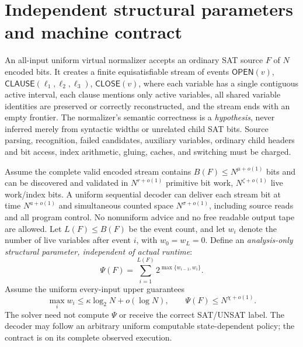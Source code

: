 \documentclass[11pt]{article}
\begin{document}
\section{Independent structural parameters and machine contract}
An all-input uniform virtual normalizer accepts an ordinary SAT source \(F\) of \(N\) encoded bits. It creates a finite equisatisfiable stream of events \(\mathsf{OPEN}(v)\), \(\mathsf{CLAUSE}(\ell_1,\ell_2,\ell_3)\), \(\mathsf{CLOSE}(v)\), where each variable has a single contiguous active interval, each clause mentions only active variables, all shared variable identities are preserved or correctly reconstructed, and the stream ends with an empty frontier. The normalizer's semantic correctness is a \emph{hypothesis}, never inferred merely from syntactic widths or unrelated child SAT bits. Source parsing, recognition, failed candidates, auxiliary variables, ordinary child headers and bit access, index arithmetic, gluing, caches, and switching must be charged.

Assume the complete valid encoded stream contains \(B(F)\le N^{\mu+o(1)}\) bits and can be discovered and validated in \(N^{r+o(1)}\) primitive bit work, \(N^{\zeta+o(1)}\) live work/index bits. A uniform sequential decoder can deliver each stream bit at time \(N^{a+o(1)}\) and simultaneous counted space \(N^{\sigma+o(1)}\), including source reads and all program control. No nonuniform advice and no free readable output tape are allowed. Let \(L(F)\le B(F)\) be the event count, and let \(w_i\) denote the number of live variables after event \(i\), with \(w_0=w_L=0\). Define an \emph{analysis-only structural parameter, independent of actual runtime}:
\[
 \Psi(F)=\sum_{i=1}^{L(F)}2^{\max\{w_{i-1},w_i\}}.
 \tag{1}
\]
Assume the uniform every-input upper guarantees
\[
  \max_i w_i\le \kappa\log_2 N+o(\log N),\qquad
  \Psi(F)\le N^{\chi+o(1)}.
  \tag{2}
\]
The solver need not compute \(\Psi\) or receive the correct SAT/UNSAT label. The decoder may follow an arbitrary uniform computable state-dependent policy; the contract is on its complete observed execution.
\end{document}
